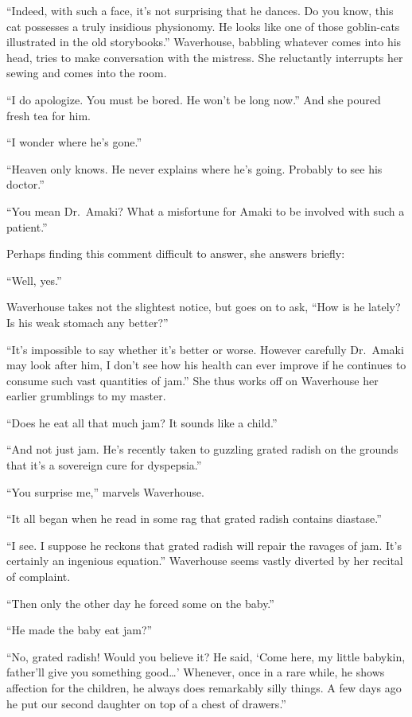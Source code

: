 \documentclass[12pt, openright]{book}
\begin{document}
``Indeed, with such a face, it's not surprising that he dances. Do you
know, this cat possesses a truly insidious physionomy. He looks like one
of those goblin-cats illustrated in the old storybooks.'' Waverhouse,
babbling whatever comes into his head, tries to make conversation with
the mistress. She reluctantly interrupts her sewing and comes into the
room.

``I do apologize. You must be bored. He won't be long now.'' And she
poured fresh tea for him.

``I wonder where he's gone.''

``Heaven only knows. He never explains where he's going. Probably to see
his doctor.''

``You mean Dr.~Amaki? What a misfortune for Amaki to be involved with
such a patient.''

Perhaps finding this comment difficult to answer, she answers briefly:

``Well, yes.''

Waverhouse takes not the slightest notice, but goes on to ask, ``How is
he lately? Is his weak stomach any better?''

``It's impossible to say whether it's better or worse. However carefully
Dr.~Amaki may look after him, I don't see how his health can ever
improve if he continues to consume such vast quantities of jam.'' She
thus works off on Waverhouse her earlier grumblings to my master.

``Does he eat all that much jam? It sounds like a child.''

``And not just jam. He's recently taken to guzzling grated radish on the
grounds that it's a sovereign cure for dyspepsia.''

``You surprise me,'' marvels Waverhouse.

``It all began when he read in some rag that grated radish contains
diastase.''

``I see. I suppose he reckons that grated radish will repair the ravages
of jam. It's certainly an ingenious equation.'' Waverhouse seems vastly
diverted by her recital of complaint.

``Then only the other day he forced some on the baby.''

``He made the baby eat jam?''

``No, grated radish! Would you believe it? He said, `Come here, my
little babykin, father'll give you something good\ldots{}' Whenever,
once in a rare while, he shows affection for the children, he always
does remarkably silly things. A few days ago he put our second daughter
on top of a chest of drawers.''
\end{document}
